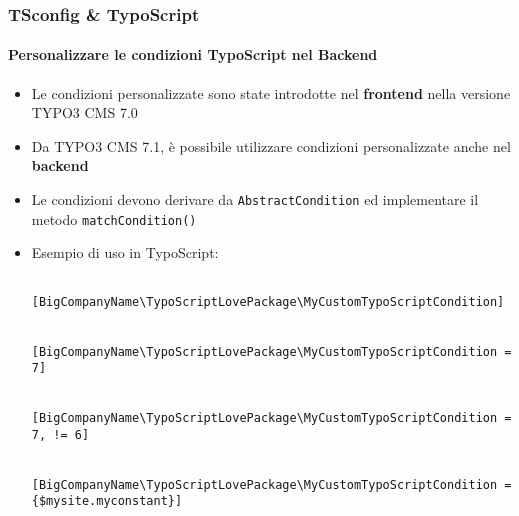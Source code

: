 
\begin{frame}[fragile]
	\frametitle{TSconfig \& TypoScript}
	\framesubtitle{Personalizzare le condizioni TypoScript nel Backend}

	\lstset{basicstyle=\tiny\ttfamily}

	\begin{itemize}
	
		\item Le condizioni personalizzate sono state introdotte nel \textbf{frontend} nella versione TYPO3 CMS 7.0
		\item Da TYPO3 CMS 7.1, è possibile utilizzare condizioni personalizzate anche nel \textbf{backend}
		\item Le condizioni devono derivare da \texttt{AbstractCondition} ed implementare il metodo \texttt{matchCondition()}
		\item Esempio di uso in TypoScript: 

			\begin{lstlisting}
				[BigCompanyName\TypoScriptLovePackage\MyCustomTypoScriptCondition]

				[BigCompanyName\TypoScriptLovePackage\MyCustomTypoScriptCondition = 7]

				[BigCompanyName\TypoScriptLovePackage\MyCustomTypoScriptCondition = 7, != 6]

				[BigCompanyName\TypoScriptLovePackage\MyCustomTypoScriptCondition = {$mysite.myconstant}]
			\end{lstlisting}

	\end{itemize}

\end{frame}


